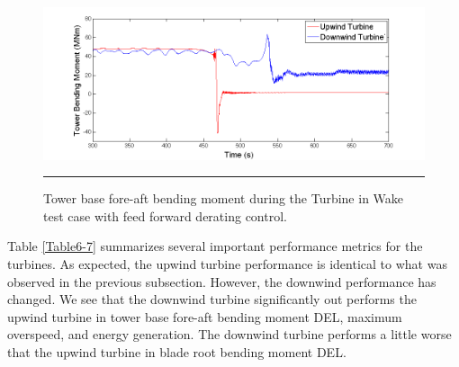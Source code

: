 \begin{figure}[htbp] \label{fig6-38}
	\centering
		\includegraphics[trim = {1cm 0 2cm 0}, clip, width = \linewidth]{Figures/ch6Figures/fig6-38.png}
		\rule{35em}{0.5pt}
	\caption{Tower base fore-aft bending moment during the Turbine in Wake test case with feed forward derating control.}
\end{figure}

Table \ref{Table6-7} summarizes several important performance metrics for the turbines. As expected, the upwind turbine performance is identical to what was observed in the previous subsection. However, the downwind performance has changed. We see that the downwind turbine significantly out performs the upwind turbine in tower base fore-aft bending moment DEL, maximum overspeed, and energy generation. The downwind turbine performs a little worse that the upwind turbine in blade root bending moment DEL.

